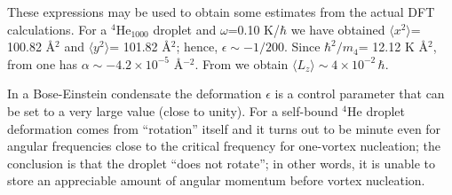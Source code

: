  These expressions may be used to obtain some estimates from the actual DFT calculations.
 For  a $^4$He$_{1000}$ droplet and $\omega$=0.10 K/$\hbar$ 
 we have obtained $\langle x^2\rangle$= 100.82 \AA$^2$ and  $\langle y^2\rangle$= 101.82 \AA$^2$; hence,
 $\epsilon \sim -1/200$. Since $\hbar^2/m_4$= 12.12 K \AA$^2$, from  one has $\alpha \sim -4.2 \times 10^{-5}$ \AA$^{-2}$. 
From  we obtain  $\langle L_z\rangle \sim 4 \times 10^{-2} \, \hbar$.
  
 In a Bose-Einstein condensate  the deformation $\epsilon$ is a control parameter that can be set to a very large value (close to unity). For a self-bound $^4$He droplet deformation comes from
 ``rotation'' itself and it turns out to be minute
  even for angular frequencies close to the critical frequency  for one-vortex nucleation; the conclusion is that the droplet ``does not rotate'';
 in other words, it is unable to store an appreciable amount of angular momentum before vortex  nucleation.
\clearpage{\pagestyle{empty}\cleardoublepage}